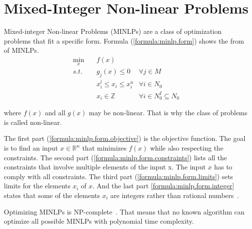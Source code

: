 \section{Mixed-Integer Non-linear Problems}
\label{fundamentals:minlp}

Mixed-integer Non-linear Problems (MINLPs) are a class of optimization problems that fit a specific form.
Formula (\ref{formula:minlp.form}) shows the from of MINLPs.
\begin{subequations}
  \label{formula:minlp.form}
  \begin{align}
    \min_x \quad
    & f(x)
    \label{formula:minlp.form.objective}
    \\
    s.t. \quad
    & g_j(x) \leq 0
    & \forall j \in M
    \label{formula:minlp.form.constraints}
    \\
    & x_i^l \leq x_i \leq x_i^u
    & \forall i \in N_0
    \label{formula:minlp.form.limits}
    \\
    & x_i \in \mathbb{Z}
    & \forall i \in N_0^I \subseteq N_0
    \label{formula:minlp.form.integer}
  \end{align}
\end{subequations}

where $f(x)$ and all $g(x)$ may be non-linear.
That is why the class of problems is called non-linear.

The first part (\ref{formula:minlp.form.objective}) is the objective function.
The goal is to find an input $x \in \mathbb{R}^n$ that minimizes $f(x)$ while also respecting the constraints.
The second part (\ref{formula:minlp.form.constraints}) lists all the constraints that involve multiple elements of the input x.
The input $x$ has to comply with all constraints.
The third part (\ref{formula:minlp.form.limits}) sets limits for the elements $x_i$ of $x$.
And the last part \ref{formula:minlp.form.integer} states that some of the elements $x_i$ are integers rather than rational numbers~\cite{Belotti2009}.

Optimizing MINLPs is NP-complete~\cite{Bienstock1996}.
That means that no known algorithm can optimize all possible MINLPs with polynomial time complexity.
